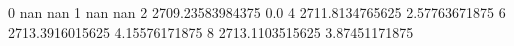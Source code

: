 0 nan nan
1 nan nan
2 2709.23583984375 0.0
4 2711.8134765625 2.57763671875
6 2713.3916015625 4.15576171875
8 2713.1103515625 3.87451171875
